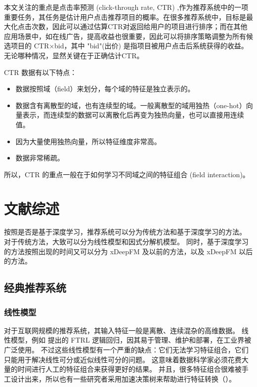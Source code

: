 \documentclass[degree=project,degree-type=project,cjk-font=noto]{thuthesis}
\begin{document}
本文关注的重点是点击率预测 (click-through rate, CTR) ,作为推荐系统中的一项重要任务，其任务是估计用户点击推荐项目的概率。在很多推荐系统中，目标是最大化点击次数，因此可以通过估算CTR对返回给用户的项目进行排序；而在其他应用场景中，如在线广告，提高收益也很重要，因此可以将排序策略调整为所有候选项目的 CTR×bid，其中 "bid"(出价) 是指项目被用户点击后系统获得的收益。无论哪种情况，显然关键在于正确估计CTR。

CTR 数据有以下特点：

\begin{itemize}
  \item 数据按照域（field）来划分，每个域的特征是独立表示的。
  \item 数据含有离散型的域，也有连续型的域。一般离散型的域用独热（one-hot）向量表示，而连续型的数据可以离散化后再变为独热向量，也可以直接用连续值。
  \item 因为大量使用独热向量，所以特征维度非常高。
  \item 数据非常稀疏。
\end{itemize}

所以，CTR 的重点一般在于如何学习不同域之间的特征组合 (field interaction)。

\chapter{文献综述}

按照是否是基于深度学习，推荐系统可以分为传统方法和基于深度学习的方法。
对于传统方法，大致可以分为线性模型和因式分解机模型。
同时，基于深度学习的方法按照出现的时间又可以分为 xDeepFM 及以前的方法，以及 xDeepFM 以后的方法。

\section{经典推荐系统}

\subsection{线性模型}

对于互联网规模的推荐系统，其输入特征一般是离散、连续混杂的高维数据。
线性模型，例如 \cite{tfrl} 提出的 FTRL 逻辑回归，因其易于管理、维护和部署，在工业界被广泛使用。
不过这些线性模型有一个严重的缺点：它们无法学习特征组合，它们只能用于解决线性可分或近似线性可分的问题。
这意味着数据科学家必须花费大量的时间进行人工的特征组合来获得更好的结果。
并且，很多特征组合很难被手工设计出来，所以也有一些研究者采用加速决策树来帮助进行特征转换（\cite{ctr_bing}）。
\end{document}
